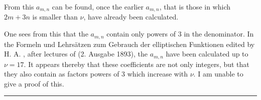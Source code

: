 
From this $a_{m,n}$ can be found, once the earlier $a_{m,n}$, that is those
in which $2m+3n$ is smaller than $\nu$, have already been calculated.

One sees from this that the $a_{m,n}$ contain only powers of 3 in the
denominator. In the \glqq Formeln und Lehrsätzen zum Gebrauch der
elliptischen Funktionen\grqq{} edited by H. A. , after
lectures of  (2. Ausgabe 1893), the $a_{m,n}$ have
been calculated up to $\nu=17$. It appears thereby that these coefficients
are not only integers, but that they also contain as factors powers of 3
which increase with $\nu$. I am unable to give a proof of this.

\begin{center}
\rule{2cm}{0.4pt}
\end{center}
